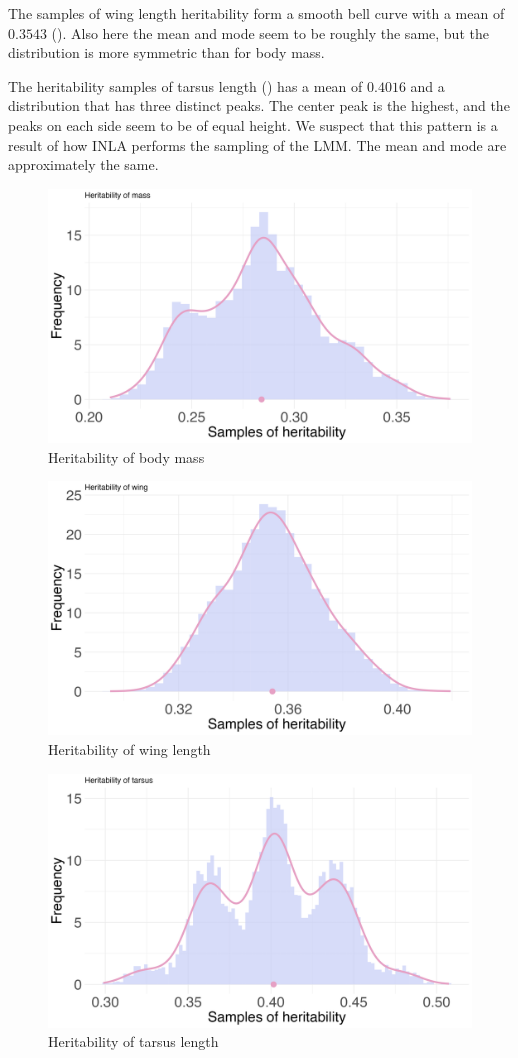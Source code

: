 The samples of wing length heritability form a smooth bell curve with a mean of $0.3543$ (). Also here the mean and mode seem to be roughly the same, but the distribution is more symmetric than for body mass.

The heritability samples of tarsus length () has a mean of $0.4016$ and a distribution that has three distinct peaks. The center peak is the highest, and the peaks on each side seem to be of equal height. We suspect that this pattern is a result of how INLA performs the sampling of the LMM. The mean and mode are approximately the same.



\begin{figure}[H]
    \centering
      \includegraphics[width=0.7\linewidth]{Figures/House sparrow study/Heritability_mass.png}
      \caption{Heritability of body mass}
      \label{fig:heritability_mass}
  \end{figure}
  \begin{figure}[H]%
    \centering
    \includegraphics[width=0.7\linewidth]{Figures/House sparrow study/Heritability_wing.png}
    \caption{Heritability of wing length}
    \label{fig:heritability_wing}
  \end{figure}
  \begin{figure}[H]%
    \centering
    \includegraphics[width=0.7\linewidth]{Figures/House sparrow study/Heritability_tarsus.png}
    \caption{Heritability of tarsus length}
    \label{fig:heritability_tarsus}
  \end{figure}


